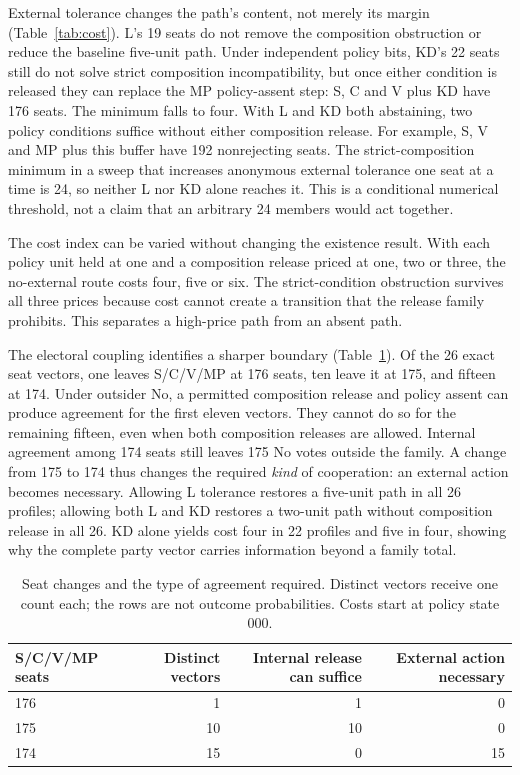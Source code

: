 \documentclass[11pt,a4paper]{article}
\begin{document}
External tolerance changes the path's content, not merely its margin (Table~\ref{tab:cost}). L's 19 seats do not remove the composition obstruction or reduce the baseline five-unit path. Under independent policy bits, KD's 22 seats still do not solve strict composition incompatibility, but once either condition is released they can replace the MP policy-assent step: S, C and V plus KD have 176 seats. The minimum falls to four. With L and KD both abstaining, two policy conditions suffice without either composition release. For example, S, V and MP plus this buffer have 192 nonrejecting seats. The strict-composition minimum in a sweep that increases anonymous external tolerance one seat at a time is 24, so neither L nor KD alone reaches it. This is a conditional numerical threshold, not a claim that an arbitrary 24 members would act together.

The cost index can be varied without changing the existence result. With each policy unit held at one and a composition release priced at one, two or three, the no-external route costs four, five or six. The strict-condition obstruction survives all three prices because cost cannot create a transition that the release family prohibits. This separates a high-price path from an absent path.

The electoral coupling identifies a sharper boundary (Table~\ref{tab:coupling}). Of the 26 exact seat vectors, one leaves S/C/V/MP at 176 seats, ten leave it at 175, and fifteen at 174. Under outsider No, a permitted composition release and policy assent can produce agreement for the first eleven vectors. They cannot do so for the remaining fifteen, even when both composition releases are allowed. Internal agreement among 174 seats still leaves 175 No votes outside the family. A change from 175 to 174 thus changes the required \emph{kind} of cooperation: an external action becomes necessary. Allowing L tolerance restores a five-unit path in all 26 profiles; allowing both L and KD restores a two-unit path without composition release in all 26. KD alone yields cost four in 22 profiles and five in four, showing why the complete party vector carries information beyond a family total.

\begin{table}[tbp]\centering
\caption{Seat changes and the type of agreement required. Distinct vectors receive one count each; the rows are not outcome probabilities. Costs start at policy state \(000\).}
\label{tab:coupling}
\begin{tabular}{lrrr}
\toprule
S/C/V/MP seats & Distinct vectors & Internal release can suffice & External action necessary\\
\midrule
176 & 1 & 1 & 0\\
175 & 10 & 10 & 0\\
174 & 15 & 0 & 15\\
\bottomrule
\end{tabular}
\end{table}
\end{document}
